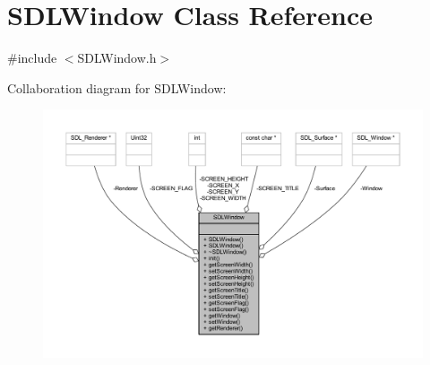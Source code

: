 \hypertarget{class_s_d_l_window}{}\section{S\+D\+L\+Window Class Reference}
\label{class_s_d_l_window}


{\ttfamily \#include $<$S\+D\+L\+Window.\+h$>$}



Collaboration diagram for S\+D\+L\+Window\+:\nopagebreak
\begin{figure}[H]
\begin{center}
\leavevmode
\includegraphics[width=350pt]{class_s_d_l_window__coll__graph}
\end{center}
\end{figure}
